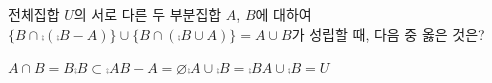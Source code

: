전체집합 $U$의 서로 다른 두 부분집합 $A$, $B$에 대하여 $\{B\cap\comp{(\comp{B}-A)}\}\cup\{B\cap(\comp{B}\cup A)\}=A\cup B$가 성립할 때, 다음 중 옳은 것은?
\begin{choices32}{$A\cap B=B$}{$\comp{B}\subset\comp{A}$}{$B-A=\varnothing$}{$\comp{A}\cup\comp{B}=\comp{B}$}{$A\cup\comp{B}=U$}\end{choices32}
